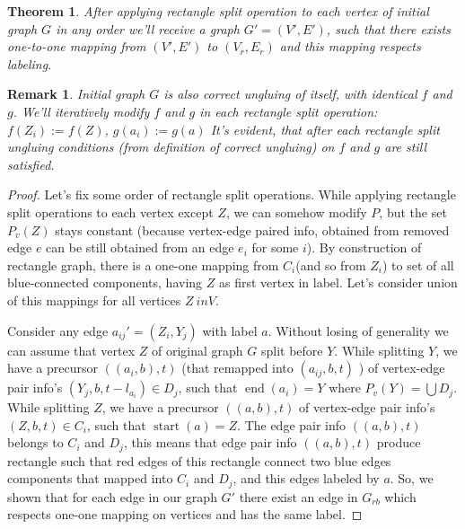 \documentclass[12pt,a4paper,oneside]{article}
\newtheorem{theorem}{Theorem}
\newtheorem{remark}{Remark}
\begin{document}
\begin{theorem}
  After applying rectangle split operation to each vertex of initial graph $G$ in any order we'll receive a graph $G' = (V', E')$, such that there exists one-to-one mapping from $(V', E')$ to $(V_r, E_r)$ and this mapping respects labeling.
\end{theorem}
\begin{remark}
 Initial graph $G$ is also correct ungluing of itself, with identical $f$ and $g$. We'll iteratively modify $f$ and $g$ in each rectangle split operation:
$f(Z_i):= f(Z)$, $g(a_i):= g(a)$
 It's evident, that after each rectangle split ungluing conditions (from definition of correct ungluing) on $f$ and $g$ are still satisfied.
\end{remark}
\begin{proof}
Let's fix some order of rectangle split operations.
While applying rectangle split operations to each vertex except $Z$, we can somehow modify $P$, but the set $P_v(Z)$ stays constant (because vertex-edge paired info, obtained from removed edge $e$ can be still obtained from an edge $e_i$ for some $i$). By construction of rectangle graph, there is a one-one mapping from $C_i$(and so from $Z_i$) to set of all blue-connected components, having $Z$ as first vertex in label. Let's consider union of this mappings for all vertices $Z \ in V$. 

Consider any edge $a_{ij}'=(Z_i, Y_j)$ with label $a$. 
Without losing of generality we can assume that vertex $Z$ of original graph $G$ split before $Y$. While splitting  $Y$, we have a precursor $((a_{i}, b), t)$ (that remapped into $(a_{ij}, b, t)$ ) of vertex-edge pair info's $(Y_j, b, t-l_{a_i}) \in D_j$, such that $\mathop{end}(a_{i}) = Y$ where $P_v(Y) = \bigcup D_j$. While splitting $Z$, we have a precursor $((a, b), t)$ of vertex-edge pair info's $(Z, b, t) \in C_i$, such that $\mathop{start}(a) = Z$. The edge pair info $((a, b), t)$ belongs to $C_i$ and $D_j$, this means that edge pair info $((a, b), t)$ produce rectangle such that red edges of this rectangle connect two blue edges  components that mapped into $C_i$ and $D_j$, and this edges labeled by $a$. So, we shown that for each edge in our graph $G'$ there exist an edge in $G_{rb}$ which respects one-one mapping on vertices and has the same label.



\end{proof}
\end{document}
